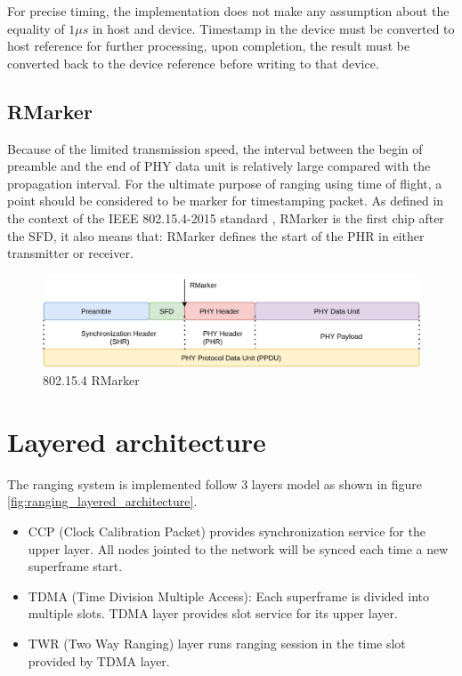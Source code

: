 \documentclass[\main/main.tex]{subfiles}
\begin{document}
For precise timing, the implementation does not make any assumption about the equality of $1\mu s$ in host and device. Timestamp in the device must be converted to host reference for further processing, upon completion, the result must be converted back to the device reference before writing to that device. 
\subsection{RMarker}
Because of the limited transmission speed, the interval between the begin of preamble and the end of PHY data unit is relatively large compared with the propagation interval. For the ultimate purpose of ranging using time of flight, a point should be considered to be marker for timestamping packet. As defined in the context of the IEEE 802.15.4-2015 standard \cite{IEEE_Std_802_15_4_2015}, RMarker is the first chip after the SFD, it also means that: RMarker defines the start of the PHR in either transmitter or receiver. 

\begin{figure}[H]
    \begin{center}
        \includegraphics[scale=0.3]{802_15_4_physical.png}
    \end{center}
    \caption{802.15.4 RMarker}
    \label{fig:802_15_4_rmarker}
\end{figure}

\section{Layered architecture}
The ranging system is implemented follow 3 layers model as shown in figure \ref{fig:ranging_layered_architecture}. 
\begin{itemize}
    \item CCP (Clock Calibration Packet) provides synchronization service for the upper layer. All nodes jointed to the network will be synced each time a new superframe start.
    \item TDMA (Time Division Multiple Access): Each superframe is divided into multiple slots. TDMA layer provides slot service for its upper layer. 
    \item TWR (Two Way Ranging) layer runs ranging session in the time slot provided by TDMA layer.
\end{itemize}
\end{document}
